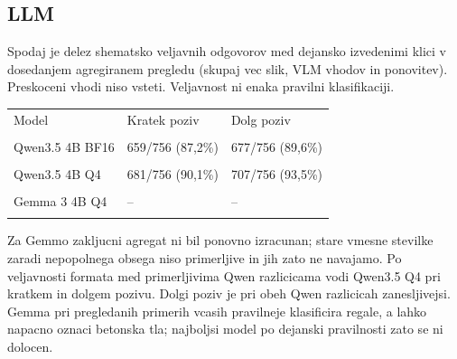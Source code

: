 \subsection{LLM}
Spodaj je delez shematsko veljavnih odgovorov med dejansko izvedenimi klici v dosedanjem agregiranem pregledu (skupaj vec slik, VLM vhodov in ponovitev). Preskoceni vhodi niso vsteti. Veljavnost ni enaka pravilni klasifikaciji.
\begin{tabular}{|p{4.5cm}|p{4cm}|p{4cm}|}
\hline Model & Kratek poziv & Dolg poziv \\\\ \hline
Qwen3.5 4B BF16 & 659/756 (87,2\%) & 677/756 (89,6\%) \\\\ \hline
Qwen3.5 4B Q4 & 681/756 (90,1\%) & 707/756 (93,5\%) \\\\ \hline
Gemma 3 4B Q4 & -- & -- \\\\ \hline
\end{tabular}
Za Gemmo zakljucni agregat ni bil ponovno izracunan; stare vmesne stevilke zaradi nepopolnega obsega niso primerljive in jih zato ne navajamo.
Po veljavnosti formata med primerljivima Qwen razlicicama vodi Qwen3.5 Q4 pri kratkem in dolgem pozivu. Dolgi poziv je pri obeh Qwen razlicicah zanesljivejsi. Gemma pri pregledanih primerih vcasih pravilneje klasificira regale, a lahko napacno oznaci betonska tla; najboljsi model po dejanski pravilnosti zato se ni dolocen.